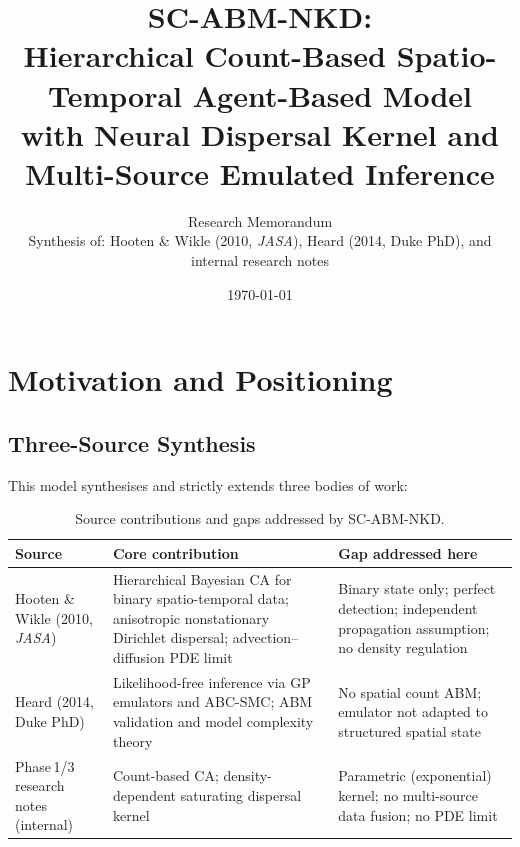 \documentclass[12pt,a4paper]{article}
\title{%
  \textbf{SC-ABM-NKD:}\\[4pt]
  \large Hierarchical Count-Based Spatio-Temporal Agent-Based Model\\
  with Neural Dispersal Kernel and Multi-Source Emulated Inference
}
\author{%
  Research Memorandum\\[2pt]
  \small Synthesis of: Hooten \& Wikle (2010, \textit{JASA}),
  Heard (2014, Duke PhD), and internal research notes
}
\date{\today}
\theoremstyle{definition}
\begin{document}
\maketitle
\tableofcontents
\newpage

\section{Motivation and Positioning}
\label{sec:motivation}

\subsection{Three-Source Synthesis}

This model synthesises and strictly extends three bodies of work:

\begin{table}[h!]
\centering
\small
\renewcommand{\arraystretch}{1.35}
\begin{tabular}{p{3.6cm}p{5.2cm}p{5.2cm}}
\toprule
\textbf{Source} & \textbf{Core contribution} & \textbf{Gap addressed here} \\
\midrule
Hooten \& Wikle (2010, \textit{JASA}) &
  Hierarchical Bayesian CA for binary spatio-temporal data; anisotropic nonstationary Dirichlet dispersal; advection–diffusion PDE limit &
  Binary state only; perfect detection; independent propagation assumption; no density regulation \\[4pt]
Heard (2014, Duke PhD) &
  Likelihood-free inference via GP emulators and ABC-SMC; ABM validation and model complexity theory &
  No spatial count ABM; emulator not adapted to structured spatial state \\[4pt]
Phase\,1/3 research notes (internal) &
  Count-based CA; density-dependent saturating dispersal kernel &
  Parametric (exponential) kernel; no multi-source data fusion; no PDE limit \\
\bottomrule
\end{tabular}
\caption{Source contributions and gaps addressed by SC-ABM-NKD.}
\label{tab:sources}
\end{table}
\end{document}

